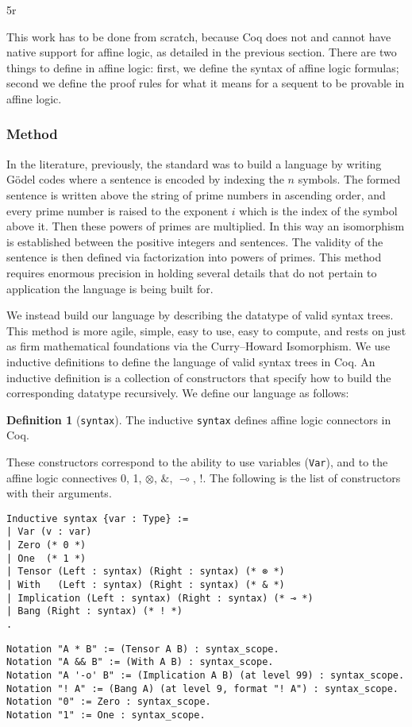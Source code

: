 5r\documentclass{article}
\theoremstyle{definition}
\newtheorem{defn}{Definition}
\begin{document}
This work has to be done from scratch, because Coq does not and cannot have native support for affine logic, as detailed in the previous section. There are two things to define in affine logic: first, we define the syntax of affine logic formulas; second we define the proof rules for what it means for a sequent to be provable in affine logic. 

\subsubsection{Method}\label{library:affine:method}

In the literature, previously, the standard was to build a language by writing Gödel codes where a sentence is encoded by indexing the $n$ symbols. The formed sentence is written above the string of prime numbers in ascending order, and every prime number is raised to the exponent $i$ which is the index of the symbol above it. Then these powers of primes are multiplied. In this way an isomorphism is established between the positive integers and sentences. The validity of the sentence is then defined via factorization into powers of primes. This method requires enormous precision in holding several details that do not pertain to application the language is being built for. 

We instead build our language by describing the datatype of valid syntax trees. This method is more agile, simple, easy to use, easy to compute, and rests on just as firm mathematical foundations via the Curry--Howard Isomorphism. We use inductive definitions to define the language of valid syntax trees in Coq. An inductive definition is a collection of constructors that specify how to build the corresponding datatype recursively. We define our language as follows: 

\begin{defn}[\texttt{syntax}]
The inductive \verb|syntax| defines affine logic connectors in Coq. 
\end{defn}


These constructors correspond to the ability to use variables (\verb|Var|), and to the affine logic connectives 0, 1, $\otimes$, $\&$, $\multimap$, $!$.  The following is the list of constructors with their arguments.

\begin{verbatim}
Inductive syntax {var : Type} :=
| Var (v : var)
| Zero (* 0 *)
| One  (* 1 *)
| Tensor (Left : syntax) (Right : syntax) (* ⊗ *)
| With   (Left : syntax) (Right : syntax) (* & *)
| Implication (Left : syntax) (Right : syntax) (* ⊸ *)
| Bang (Right : syntax) (* ! *)
.
\end{verbatim}
\begin{verbatim}
Notation "A * B" := (Tensor A B) : syntax_scope.
Notation "A && B" := (With A B) : syntax_scope.
Notation "A '-o' B" := (Implication A B) (at level 99) : syntax_scope.
Notation "! A" := (Bang A) (at level 9, format "! A") : syntax_scope.
Notation "0" := Zero : syntax_scope.
Notation "1" := One : syntax_scope.
\end{verbatim}
\end{document}
